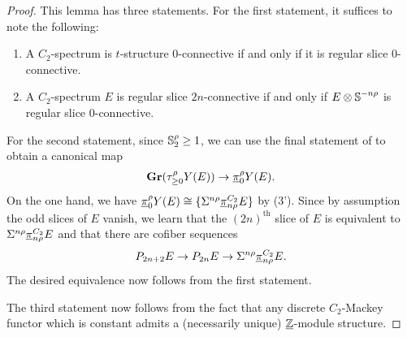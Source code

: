 \begin{proof}
  This lemma has three statements.
  For the first statement, it suffices to note the following:
  \begin{enumerate}
    \item A $C_2$-spectrum is $t$-structure $0$-connective if and only if it is regular slice $0$-connective.
\item A $C_2$-spectrum $E$ is regular slice $2n$-connective if and only if $E \otimes \operatorname{\mathbb{S}}^{-n\rho}$ is regular slice $0$-connective.
  \end{enumerate}

  For the second statement, since $\operatorname{\mathbb{S}}^{\rho} _2 \geq 1$, we can use the final statement of  to obtain a canonical map
  \[\operatorname{\mathbf{Gr}} (\tau_{\geq 0} ^{\rho} Y(E)) \to \underline{\pi}_0 ^{\rho} Y(E).\]
  On the one hand, we have
  $ \underline{\pi}_0 ^\rho Y(E) \cong \{\Sigma^{n\rho} \underline{\pi}_{n\rho} ^{C_2} E\} $
  by (3'). 
  Since by assumption the odd slices of $E$ vanish, we learn that
  the $(2n)^{\mathrm{th}}$ slice of $E$ is equivalent to $\Sigma^{n\rho} \underline{\pi}_{n\rho} ^{C_2} E$ and
  that there are cofiber sequences
  \[ P_{2n+2} E \to P_{2n} E \to \Sigma^{n\rho} \underline{\pi}_{n\rho} ^{C_2} E. \]
  The desired equivalence now follows from the first statement.

  The third statement now follows from the fact that any discrete $C_2$-Mackey functor which is constant admits a (necessarily unique) $\underline{\mathbb{Z}}$-module structure.
\end{proof}


